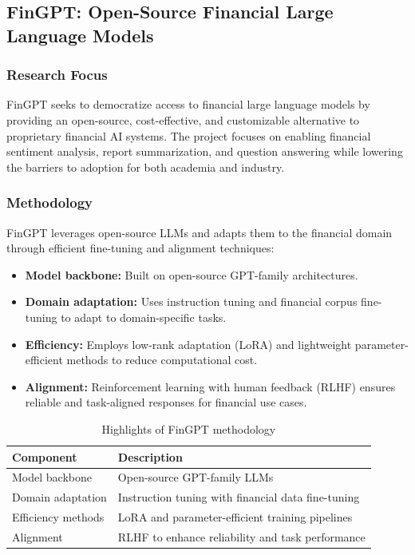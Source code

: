 \documentclass[12pt,a4paper]{report}
\begin{document}

\subsection{FinGPT: Open-Source Financial Large Language Models \cite{yang2023fingpt}}

\subsubsection{Research Focus}
FinGPT seeks to democratize access to financial large language models by providing an open-source, cost-effective, and customizable alternative to proprietary financial AI systems. The project focuses on enabling financial sentiment analysis, report summarization, and question answering while lowering the barriers to adoption for both academia and industry.

\subsubsection{Methodology}
FinGPT leverages open-source LLMs and adapts them to the financial domain through efficient fine-tuning and alignment techniques:
\begin{itemize}
    \item \textbf{Model backbone:} Built on open-source GPT-family architectures.  
    \item \textbf{Domain adaptation:} Uses instruction tuning and financial corpus fine-tuning to adapt to domain-specific tasks.  
    \item \textbf{Efficiency:} Employs low-rank adaptation (LoRA) and lightweight parameter-efficient methods to reduce computational cost.  
    \item \textbf{Alignment:} Reinforcement learning with human feedback (RLHF) ensures reliable and task-aligned responses for financial use cases.  
\end{itemize}

\begin{table}[h]
\centering
\caption{Highlights of FinGPT methodology}
\begin{tabular}{p{3.5cm} p{9cm}}
\toprule
\textbf{Component} & \textbf{Description} \\
\midrule
Model backbone & Open-source GPT-family LLMs \\
Domain adaptation & Instruction tuning with financial data fine-tuning \\
Efficiency methods & LoRA and parameter-efficient training pipelines \\
Alignment & RLHF to enhance reliability and task performance \\
\bottomrule
\end{tabular}
\end{table}
\end{document}
